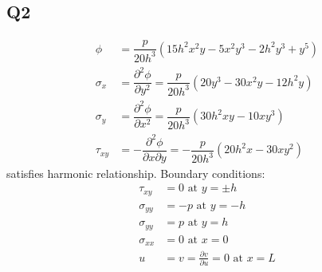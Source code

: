 \documentclass[11pt]{article}
\numberwithin{equation}{section}
\begin{document}
\subsection{Q2}
\begin{align}
    \phi      & = \dfrac{p}{20h^3} \left(15h^2x^2y-5x^2y^3-2h^2y^3+y^5\right)                                    \\
    \sigma_x  & = \dfrac{\partial^2 \phi}{\partial y^2} = \dfrac{p}{20h^3}\left(20y^3 -30x^2y-12h^2y\right)      \\
    \sigma_y  & = \dfrac{\partial^2 \phi}{\partial x^2} = \dfrac{p}{20h^3}\left(30h^2xy-10xy^3\right)            \\
    \tau_{xy} & = -\dfrac{\partial^2 \phi}{\partial x\partial y} = - \dfrac{p}{20h^3} \left(20h^2x-30xy^2\right)
\end{align}
satisfies harmonic relationship. Boundary conditions:
\begin{align}
    \tau_{xy}   & = 0 \textrm{ at } y = \pm h                                 \\
    \sigma_{yy} & = -p \textrm{ at } y = -h                                   \\
    \sigma_{yy} & = p \textrm{ at } y = h                                     \\
    \sigma_{xx} & = 0 \textrm{ at } x = 0                                     \\
    u           & = v = \frac{\partial v}{\partial u} = 0 \textrm{ at } x = L
\end{align}
\end{document}
